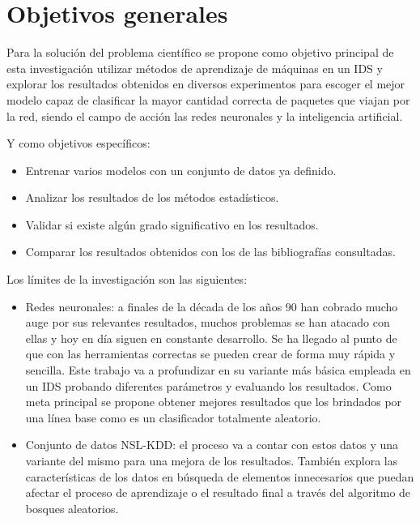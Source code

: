 \section*{Objetivos generales}
Para la solución del problema científico se propone como objetivo principal de esta investigación utilizar métodos de aprendizaje de máquinas en un IDS y explorar los resultados obtenidos en diversos experimentos para escoger el mejor modelo capaz de clasificar la mayor cantidad correcta de paquetes que viajan por la red, siendo el campo de acción las redes neuronales y la inteligencia artificial.

Y como objetivos específicos:
\begin{itemize}
    \item Entrenar varios modelos con un conjunto de datos ya definido.
    \item Analizar los resultados de los métodos estadísticos.
    \item Validar si existe algún grado significativo en los resultados.
    \item Comparar los resultados obtenidos con los de las bibliografías consultadas.
\end{itemize}

Los límites de la investigación son las siguientes:

\begin{itemize}
    \item Redes neuronales: a finales de la década de los años 90 han cobrado mucho auge por sus relevantes resultados, muchos problemas se han atacado con ellas y hoy en día siguen en constante desarrollo. Se ha llegado al punto de que con las herramientas correctas se pueden crear de forma muy rápida y sencilla. Este trabajo va a profundizar en su variante más básica empleada en un IDS probando diferentes parámetros y evaluando los resultados. Como meta principal se propone obtener mejores resultados que los brindados por una línea base como es un clasificador totalmente aleatorio. 
    \item Conjunto de datos NSL-KDD: el proceso va a contar con estos datos y una variante del mismo para una mejora de los resultados. También explora las características de los datos en búsqueda de elementos innecesarios que puedan afectar el proceso de aprendizaje o el resultado final a través del algoritmo de bosques aleatorios.
\end{itemize}

